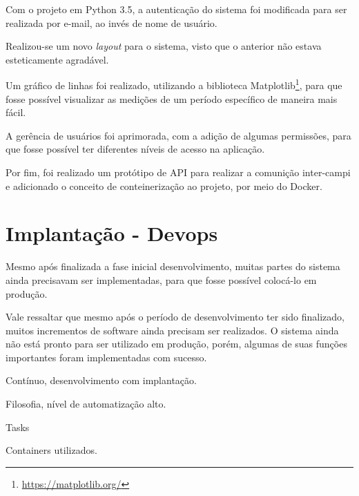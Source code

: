 Com o projeto em Python 3.5, a autenticação do sistema foi modificada para ser realizada por e-mail, ao invés de nome de usuário.

Realizou-se um novo \textit{layout} para o sistema, visto que o anterior não estava esteticamente agradável.

Um gráfico de linhas foi realizado, utilizando a biblioteca Matplotlib\footnote{\url{https://matplotlib.org/}}, para que fosse possível visualizar as medições de um período específico de maneira mais fácil.

A gerência de usuários foi aprimorada, com a adição de algumas permissões, para que fosse possível ter diferentes níveis de acesso na aplicação.

Por fim, foi realizado um protótipo de API para realizar a comunição inter-campi e adicionado o conceito de conteinerização ao projeto, por meio do Docker.

\section{Implantação - Devops}
Mesmo após finalizada a fase inicial desenvolvimento, muitas partes do sistema ainda precisavam ser implementadas, para que fosse possível colocá-lo em produção.

Vale ressaltar que mesmo após o período de desenvolvimento ter sido finalizado, muitos incrementos de software ainda precisam ser realizados. O sistema ainda não está pronto para ser utilizado em produção, porém, algumas de suas funções importantes foram implementadas com sucesso.

Contínuo, desenvolvimento com implantação.

Filosofia, nível de automatização alto.

Tasks

Containers utilizados.